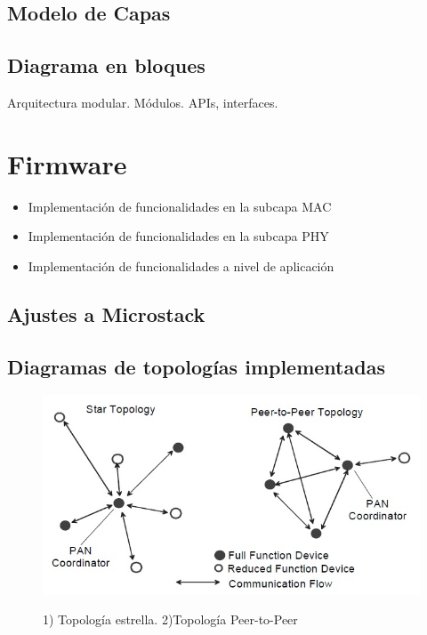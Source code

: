 \subsection{Modelo de Capas}

\subsection{Diagrama en bloques}

Arquitectura modular. Módulos. APIs, interfaces.



\section{Firmware}
\label{sec:firm}

\begin{itemize}
	\item Implementación de funcionalidades en la subcapa MAC

	\item Implementación de funcionalidades en la subcapa PHY

	\item Implementación de funcionalidades a nivel de aplicación
	
\end{itemize}

\subsection{Ajustes a Microstack}


\subsection{Diagramas de topologías implementadas}

\begin{figure}[h!]
	\centering
    \includegraphics[width=.8\textwidth]{./Figures/topologia.jpg}
	\label{fig:topo}
	\caption{1) Topología estrella. 2)Topología Peer-to-Peer}
\end{figure}

